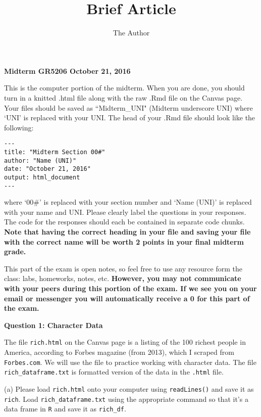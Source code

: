 \documentclass[12pt, leqno]{article}
\title{Brief Article}
\author{The Author}
\begin{document}
\begin{center}
{\large {\bf Midterm GR5206 October 21, 2016}}
\end{center}

\vspace{5 cm}

This is the computer portion of the midterm. When you are done, you should turn in a knitted .html file along with the raw .Rmd file on the Canvas page.  Your files should be saved as ``Midterm\_UNI" (Midterm underscore UNI) where `UNI' is replaced with your UNI.  The head of your .Rmd file should look like the following:
\begin{verbatim}
---
title: "Midterm Section 00#"
author: "Name (UNI)"
date: "October 21, 2016"
output: html_document
---
\end{verbatim} 
where `00\#' is replaced with your section number and `Name (UNI)' is replaced with your name and UNI.  Please clearly label the questions in your responses.  The code for the responses should each be contained in separate code chunks.  \textbf{Note that having the correct heading in your file and saving your file with the correct name will be worth 2 points in your final midterm grade.}


\vspace{1 cm}

This part of the exam is open notes, so feel free to use any resource form the class: labs, homeworks, notes, etc.  \textbf{However, you may not communicate with your peers during this portion of the exam.  If we see you on your email or messenger you will automatically receive a 0 for this part of the exam.}


\newpage


{\large\textbf{Question 1: Character Data}}

\vspace{1.5 cm}

The file \texttt{rich.html} on the Canvas page is a listing of the 100 richest people in America, according to Forbes magazine (from 2013), which I scraped from \texttt{Forbes.com}. We will use the file to practice working with character data.  The file \texttt{rich\_dataframe.txt} is formatted version of the data in the \texttt{.html} file.  

\vspace{1.5 cm}

(a) Please load \texttt{rich.html} onto your computer using \texttt{readLines()} and save it as \texttt{rich}.  Load \texttt{rich\_dataframe.txt} using the appropriate command so that it's a data frame in \texttt{R} and save it as \texttt{rich\_df}.
\end{document}

